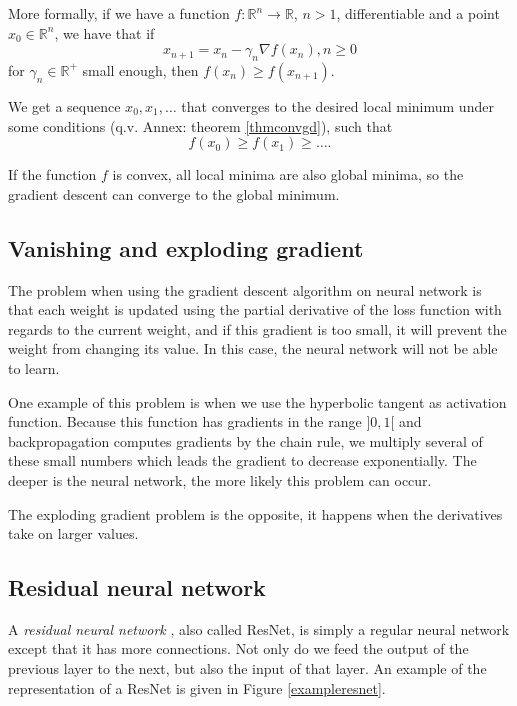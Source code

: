 \documentclass[10pt,a4paper]{article}
\theoremstyle{definition}
\theoremstyle{definition}
\theoremstyle{definition}
\begin{document}
More formally, if we have a function $f: \mathbb{R}^n \rightarrow \mathbb{R}$, $n>1$, differentiable and a point $x_0\in \mathbb{R}^n$, we have that if
$$
x_{n+1} = x_n -\gamma_n \nabla f(x_n), n\geq 0
$$
for $\gamma_n \in \mathbb{R}^+$ small enough, then $f(x_n) \geq f(x_{n+1})$. 

We get a sequence $x_0,x_1,\dots$ that converges to the desired local minimum under some conditions (q.v. Annex: theorem \ref{thmconvgd}), such that
$$
f(x_0) \geq f(x_1) \geq \dots . 
$$

If the function $f$ is convex, all local minima are also global minima, so the gradient descent can converge to the global minimum.

\subsection{Vanishing and exploding gradient}

The problem when using the gradient descent algorithm on neural network is that each weight is updated using the partial derivative of the loss function with regards to the current weight, and if this gradient is too small, it will prevent the weight from changing its value. In this case, the neural network will not be able to learn.

One example of this problem is when we use the hyperbolic tangent as activation function. Because this function has gradients in the range $]0,1[$ and backpropagation computes gradients by the chain rule, we multiply several of these small numbers which leads the gradient to decrease exponentially. The deeper is the neural network, the more likely this problem can occur.

The exploding gradient problem is the opposite, it happens when the derivatives take on larger values.


\subsection{Residual neural network} \label{rnn}

A\textit{ residual neural network} \cite{6}, also called ResNet, is simply a regular neural network except that it has more connections. Not only do we feed the output of the previous layer to the next, but also the input of that layer. 
An example of the representation of a ResNet is given in Figure \ref{exampleresnet}.
\end{document}
